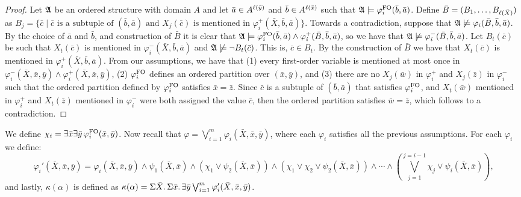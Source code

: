 \begin{proof}
	Let $\mathfrak{A}$ be an ordered structure with domain $A$ and let $\bar{a}\in A^{\ell(\bar{y})}$ and $\bar{b}\in A^{\ell(\bar{x})}$ such that $\mathfrak{A}\models\varphi^{{\rm FO}}_i(\bar{b},\bar{a})$. Define $\bar{B} = (B_1,\ldots,B_{\ell(\bar{X})})$ as $B_j = \{\bar{c}\mid\bar{c}\text{ is a subtuple of $(\bar{b},\bar{a})$ and $X_j(\bar{c})$ is mentioned in $\varphi^{+}_i(\bar{X},\bar{b},\bar{a})$}\}$. Towards a contradiction, suppose that $\mathfrak{A}\not\models\varphi_i(\bar{B},\bar{b},\bar{a})$. By the choice of $\bar{a}$ and $\bar{b}$, and construction of $\bar{B}$ it is clear that $\mathfrak{A}\models\varphi^{{\rm FO}}_i(\bar{b},\bar{a})\wedge\varphi^{+}_i(\bar{B},\bar{b},\bar{a})$, so we have that $\mathfrak{A}\not\models\varphi^{-}_i(\bar{B},\bar{b},\bar{a})$. Let $B_t(\bar{c})$ be such that $X_t(\bar{c})$ is mentioned in $\varphi^{-}_i(\bar{X},\bar{b},\bar{a})$ and $\mathfrak{A}\not\models\neg B_t(\bar{c})$. This is, $\bar{c}\in B_t$. By the construction of $\bar{B}$ we have that $X_t(\bar{c})$ is mentioned in $\varphi^{+}_i(\bar{X},\bar{b},\bar{a})$. From our assumptions, we have that (1) every first-order variable is mentioned at most once in $\varphi^{-}_i(\bar{X},\bar{x},\bar{y}) \wedge \varphi^{+}_i(\bar{X},\bar{x},\bar{y})$, (2) $\varphi^{{\rm FO}}_i$ defines an ordered partition over $(\bar{x},\bar{y})$, and (3) there are no $X_j(\bar{w})$ in $\varphi^{+}_i$ and $X_j(\bar{z})$ in $\varphi^{-}_i$ such that the ordered partition defined by $\varphi^{{\rm FO}}_i$ satisfies $\bar{x} = \bar{z}$. Since $\bar{c}$ is a subtuple of $(\bar{b},\bar{a})$ that satisfies $\varphi^{{\rm FO}}_i$, and $X_t(\bar{w})$ mentioned in $\varphi^{+}_i$ and $X_t(\bar{z})$ mentioned in $\varphi^{-}_i$ were both assigned the value $\bar{c}$, then the ordered partition satisfies $\bar{w} = \bar{z}$, which follows to a contradiction.
\end{proof}
We define $\chi_i = \exists\bar{x}\exists\bar{y}\,\varphi^{{\rm FO}}_i(\bar{x},\bar{y})$. Now recall that $\varphi = \bigvee_{i = 1}^m\varphi_i(\bar{X},\bar{x},\bar{y})$, where each $\varphi_i$ satisfies all the previous assumptions. For each $\varphi_i$ we define:
$$
\varphi_i'(\bar{X},\bar{x},\bar{y}) = \varphi_i(\bar{X},\bar{x},\bar{y})\wedge\psi_1(\bar{X},\bar{x})\wedge(\chi_1\vee\psi_2(\bar{X},\bar{x}))\wedge(\chi_1\vee\chi_2\vee\psi_2(\bar{X},\bar{x}))\wedge\cdots\wedge(
\bigvee_{j = 1}^{j = i-1}\chi_j\vee\psi_i(\bar{X},\bar{x})),
$$
and lastly, $\kappa(\alpha)$ is defined as $\kappa(\alpha) = \Sigma{\bar{X}}.\,\Sigma{\bar{x}}.\,\exists\bar{y}\bigvee_{i = 1}^m\varphi_i'(\bar{X},\bar{x},\bar{y})$.

